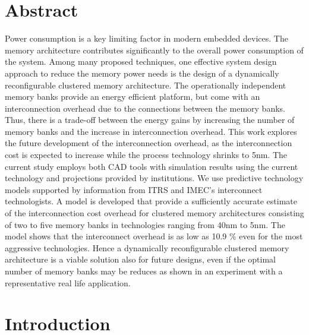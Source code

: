 \section*{\hspace*{\fill} Abstract \hspace*{\fill}}
Power consumption is a key limiting factor in modern embedded devices.
The memory architecture contributes significantly to the overall power consumption of the system.
Among many proposed techniques, one effective system design approach to reduce the memory power needs is the design of a dynamically reconfigurable clustered memory architecture.
The operationally independent memory banks provide an energy efficient platform, but come with an interconnection overhead due to the connections between the memory banks. 
Thus, there is a trade-off between the energy gains by increasing the number of memory banks and the increase in interconnection overhead.
This work explores the future development of the interconnection overhead, as the interconnection cost is expected to increase while the process technology shrinks to 5nm.
The current study employs both CAD  tools with simulation results using the current technology and projections provided by institutions.
We use predictive technology models supported by information from ITRS and IMEC's interconnect technologists.
A model is developed that provide a sufficiently accurate estimate of the interconnection cost overhead for clustered memory architectures consisting of two to five memory banks in technologies ranging from 40nm to 5nm.  
The model shows that the interconnect overhead is as low as 10.9 \% even for the most aggressive technologies. Hence a dynamically reconfigurable clustered memory architecture is a viable solution also for future designs, even if the optimal number of memory banks may be reduces as shown in an experiment with a representative real life application.
\vspace*{\fill}
\afterpage{\null\newpage}
\newpage

\section{Introduction}

